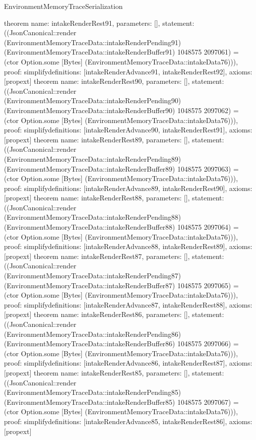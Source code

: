 \begin{lexlean}{EnvironmentMemoryTraceSerialization}
\begin{semanticmodule}
{}
theorem{
 name: intakeRenderRest91, parameters: [],
 statement: ((JsonCanonical::render (EnvironmentMemoryTraceData::intakeRenderPending91) (EnvironmentMemoryTraceData::intakeRenderBuffer91) 1048575 2097061) = (ctor Option.some [Bytes] (EnvironmentMemoryTraceData::intakeData76))), proof: simplify{definitions: [intakeRenderAdvance91, intakeRenderRest92]}, axioms: [propext]
}
theorem{
 name: intakeRenderRest90, parameters: [],
 statement: ((JsonCanonical::render (EnvironmentMemoryTraceData::intakeRenderPending90) (EnvironmentMemoryTraceData::intakeRenderBuffer90) 1048575 2097062) = (ctor Option.some [Bytes] (EnvironmentMemoryTraceData::intakeData76))), proof: simplify{definitions: [intakeRenderAdvance90, intakeRenderRest91]}, axioms: [propext]
}
theorem{
 name: intakeRenderRest89, parameters: [],
 statement: ((JsonCanonical::render (EnvironmentMemoryTraceData::intakeRenderPending89) (EnvironmentMemoryTraceData::intakeRenderBuffer89) 1048575 2097063) = (ctor Option.some [Bytes] (EnvironmentMemoryTraceData::intakeData76))), proof: simplify{definitions: [intakeRenderAdvance89, intakeRenderRest90]}, axioms: [propext]
}
theorem{
 name: intakeRenderRest88, parameters: [],
 statement: ((JsonCanonical::render (EnvironmentMemoryTraceData::intakeRenderPending88) (EnvironmentMemoryTraceData::intakeRenderBuffer88) 1048575 2097064) = (ctor Option.some [Bytes] (EnvironmentMemoryTraceData::intakeData76))), proof: simplify{definitions: [intakeRenderAdvance88, intakeRenderRest89]}, axioms: [propext]
}
theorem{
 name: intakeRenderRest87, parameters: [],
 statement: ((JsonCanonical::render (EnvironmentMemoryTraceData::intakeRenderPending87) (EnvironmentMemoryTraceData::intakeRenderBuffer87) 1048575 2097065) = (ctor Option.some [Bytes] (EnvironmentMemoryTraceData::intakeData76))), proof: simplify{definitions: [intakeRenderAdvance87, intakeRenderRest88]}, axioms: [propext]
}
theorem{
 name: intakeRenderRest86, parameters: [],
 statement: ((JsonCanonical::render (EnvironmentMemoryTraceData::intakeRenderPending86) (EnvironmentMemoryTraceData::intakeRenderBuffer86) 1048575 2097066) = (ctor Option.some [Bytes] (EnvironmentMemoryTraceData::intakeData76))), proof: simplify{definitions: [intakeRenderAdvance86, intakeRenderRest87]}, axioms: [propext]
}
theorem{
 name: intakeRenderRest85, parameters: [],
 statement: ((JsonCanonical::render (EnvironmentMemoryTraceData::intakeRenderPending85) (EnvironmentMemoryTraceData::intakeRenderBuffer85) 1048575 2097067) = (ctor Option.some [Bytes] (EnvironmentMemoryTraceData::intakeData76))), proof: simplify{definitions: [intakeRenderAdvance85, intakeRenderRest86]}, axioms: [propext]
}
\end{semanticmodule}
\end{lexlean}
